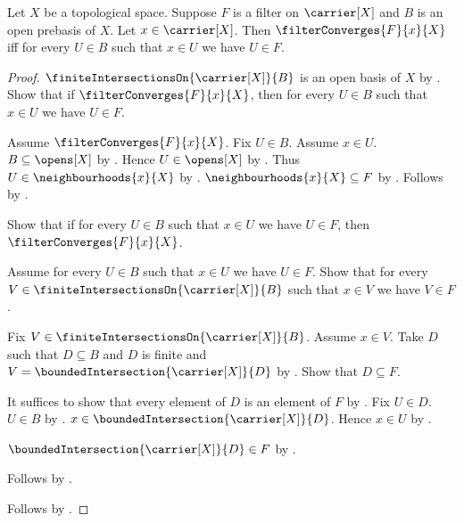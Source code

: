 \begin{theorem}\label{filter_converges_iff_open_prebasis_members}
    Let $X$ be a topological space.
    Suppose $F$ is a filter on $\carrier[X]$ and
        $B$ is an open prebasis of $X$.
    Let $x\in\carrier[X]$.
    Then $\filterConverges{F}{x}{X}$ iff
        for every $U\in B$ such that $x\in U$ we have $U\in F$.
\end{theorem}
\begin{proof}
    $\finiteIntersectionsOn{\carrier[X]}{B}$ is an open basis of $X$ by
        .
    Show that if $\filterConverges{F}{x}{X}$, then
        for every $U\in B$ such that $x\in U$ we have $U\in F$.
    \begin{subproof}
        Assume $\filterConverges{F}{x}{X}$.
        Fix $U\in B$.
        Assume $x\in U$.
        $B\subseteq\opens[X]$ by .
        Hence $U\in\opens[X]$ by .
        Thus $U\in\neighbourhoods{x}{X}$ by
            .
        $\neighbourhoods{x}{X}\subseteq F$ by
            .
        Follows by .
    \end{subproof}
    Show that if for every $U\in B$ such that $x\in U$ we have
        $U\in F$, then $\filterConverges{F}{x}{X}$.
    \begin{subproof}
        Assume for every $U\in B$ such that $x\in U$ we have
            $U\in F$.
        Show that for every
            $V\in\finiteIntersectionsOn{\carrier[X]}{B}$ such that
            $x\in V$ we have $V\in F$.
        \begin{subproof}
            Fix $V\in\finiteIntersectionsOn{\carrier[X]}{B}$.
            Assume $x\in V$.
            Take $D$ such that $D\subseteq B$ and $D$ is finite and
                $V=\boundedIntersection{\carrier[X]}{D}$ by
                .
            Show that $D\subseteq F$.
            \begin{subproof}
                It suffices to show that every element of $D$ is an
                    element of $F$ by .
                Fix $U\in D$.
                $U\in B$ by .
                $x\in\boundedIntersection{\carrier[X]}{D}$.
                Hence $x\in U$ by .
            \end{subproof}
            $\boundedIntersection{\carrier[X]}{D}\in F$ by
                .
        \end{subproof}
        Follows by
            .
    \end{subproof}
    Follows by \auto.
\end{proof}

